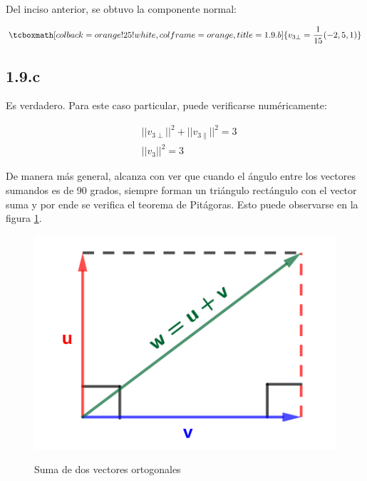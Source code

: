 \documentclass{article}
\begin{document}
Del inciso anterior, se obtuvo la componente normal:

\begin{equation}
\tcboxmath[colback=orange!25!white,colframe=orange,title=1.9.b]
{ v_{3\perp} = \frac{1}{15} (-2, 5, 1) }
\end{equation}

\subsection*{1.9.c}
\label{subsec:1.9.c}

Es verdadero. Para este caso particular, puede verificarse numéricamente:

\begin{subequations}
\begin{align}
& ||v_{3\perp}||^2 + ||v_{3\parallel}||^2 = 3 \\
& ||v_3||^2 = 3
\end{align}
\end{subequations}

De manera más general, alcanza con ver que cuando el ángulo entre los vectores sumandos es de 90 grados, siempre forman un triángulo rectángulo con el vector suma y por ende se verifica el teorema de Pitágoras. Esto puede observarse en la figura \ref{fig:1-9-c}.

\begin{figure}[ht]
\caption{Suma de dos vectores ortogonales}
\includegraphics[scale=1]{../img/exercises/guide_01/09_c.png} 
\centering
\label{fig:1-9-c}
\end{figure}
\end{document}
